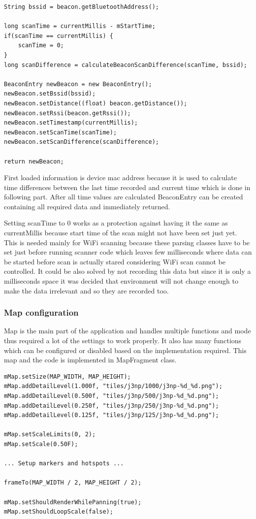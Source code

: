 \begin{lstlisting}[caption=Parsing beacon information]
String bssid = beacon.getBluetoothAddress();

long scanTime = currentMillis - mStartTime;
if(scanTime == currentMillis) {
	scanTime = 0;
}
long scanDifference = calculateBeaconScanDifference(scanTime, bssid);

BeaconEntry newBeacon = new BeaconEntry();
newBeacon.setBssid(bssid);
newBeacon.setDistance((float) beacon.getDistance());
newBeacon.setRssi(beacon.getRssi());
newBeacon.setTimestamp(currentMillis);
newBeacon.setScanTime(scanTime);
newBeacon.setScanDifference(scanDifference);

return newBeacon;
\end{lstlisting}

First loaded information is device mac address because it is used to calculate time differences between the last time recorded and current time which is done in following part. After all time values are calculated BeaconEntry can be created containing all required data and immediately returned.

Setting scanTime to 0 works as a protection against having it the same as currentMillis because start time of the scan might not have been set just yet. This is needed mainly for WiFi scanning because these parsing classes have to be set just before running scanner code which leaves few milliseconds where data can be started before scan is actually stared considering WiFi scan cannot be controlled. It could be also solved by not recording this data but since it is only a milliseconds space it was decided that environment will not change enough to make the data irrelevant and so they are recorded too.

\subsubsection{Map configuration}\label{subsubsec:MapConfiguration}
Map is the main part of the application and handles multiple functions and mode thus required a lot of the settings to work properly. It also has many functions which can be configured or disabled based on the implementation required. This map and the code is implemented in MapFragment class.

\begin{lstlisting}[caption=Map configuration]
mMap.setSize(MAP_WIDTH, MAP_HEIGHT);
mMap.addDetailLevel(1.000f, "tiles/j3np/1000/j3np-%d_%d.png");
mMap.addDetailLevel(0.500f, "tiles/j3np/500/j3np-%d_%d.png");
mMap.addDetailLevel(0.250f, "tiles/j3np/250/j3np-%d_%d.png");
mMap.addDetailLevel(0.125f, "tiles/j3np/125/j3np-%d_%d.png");

mMap.setScaleLimits(0, 2); 
mMap.setScale(0.50F);

... Setup markers and hotspots ...

frameTo(MAP_WIDTH / 2, MAP_HEIGHT / 2);

mMap.setShouldRenderWhilePanning(true);
mMap.setShouldLoopScale(false);
\end{lstlisting}

